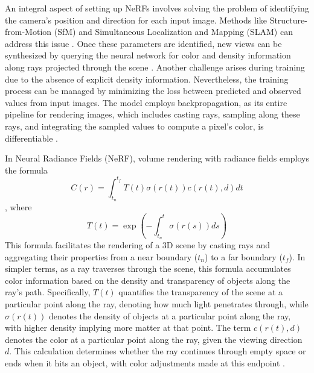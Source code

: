 An integral aspect of setting up NeRFs involves solving the problem of identifying the camera's position and direction for each input image. Methods like Structure-from-Motion (SfM) and Simultaneous Localization and Mapping (SLAM) can address this issue \citep{wei2021nerfingmvs}. Once these parameters are identified, new views can be synthesized by querying the neural network for color and density information along rays projected through the scene \citep{gerats2023dynamic}. Another challenge arises during training due to the absence of explicit density information. Nevertheless, the training process can be managed by minimizing the loss between predicted and observed values from input images. The model employs backpropagation, as its entire pipeline for rendering images, which includes casting rays, sampling along these rays, and integrating the sampled values to compute a pixel's color, is differentiable \citep{yariv2020multiview}.

In Neural Radiance Fields (NeRF), volume rendering with radiance fields employs the formula 
\[ C(r) = \int_{t_n}^{t_f} T(t)\sigma(r(t))c(r(t), d)dt \],
where 
\[ T(t) = \exp\left(-\int_{t_n}^t \sigma(r(s))ds\right) \]
This formula \citep{mildenhallNERF} facilitates the rendering of a 3D scene by casting rays and aggregating their properties from a near boundary (\(t_n\)) to a far boundary (\(t_f\)). In simpler terms, as a ray traverses through the scene, this formula accumulates color information based on the density and transparency of objects along the ray's path. Specifically, \( T(t) \) quantifies the transparency of the scene at a particular point along the ray, denoting how much light penetrates through, while \( \sigma(r(t)) \) denotes the density of objects at a particular point along the ray, with higher density implying more matter at that point. The term \( c(r(t), d) \) denotes the color at a particular point along the ray, given the viewing direction \( d \). This calculation determines whether the ray continues through empty space or ends when it hits an object, with color adjustments made at this endpoint \citep{mildenhallNERF}.


